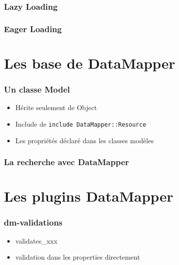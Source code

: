 \documentclass{beamer}
\begin{document}
\begin{frame}
    \frametitle{Lazy Loading}
    \begin{center}
        
    \end{center}
\end{frame}

\begin{frame}
    \frametitle{Eager Loading}
    \begin{center}
        
    \end{center}
\end{frame}

\section{Les base de DataMapper}

\begin{frame}
    \frametitle{Un classe Model}
    \begin{itemize}
        \item Hérite seulement de Object
        \item Include de \lstinline{include DataMapper::Resource}
        \item Les propriétés déclaré dans les classes modèles
    \end{itemize}
\end{frame}

\begin{frame}
    \begin{center}
        
    \end{center}
\end{frame}

\begin{frame}
    \frametitle{La recherche avec DataMapper}
    \begin{center}
        
    \end{center}
\end{frame}

\section{Les plugins DataMapper}

\begin{frame}
    \frametitle{dm-validations}

    \begin{itemize}
        \item validates\_xxx
        \item validation dans les properties directement
    \end{itemize}

    \begin{center}
        
    \end{center}
\end{frame}
\end{document}
